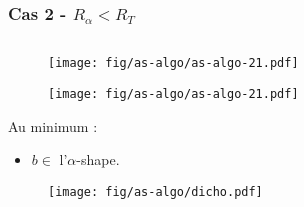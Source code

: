 \documentclass{beamer}
\begin{document}
\begin{frame}
\frametitle{Cas 2 - $R_{\alpha} < R_T$}
  
  \begin{columns}[t]
   \begin{column}{7cm}
      {
        \begin{figure}[h!]
          \centering
          \texttt{[image: fig/as-algo/as-algo-21.pdf]}
      \end{figure}
      }
      {
        \begin{figure}[h!]
          \centering
          \texttt{[image: fig/as-algo/as-algo-21.pdf]}
      \end{figure}
      }
      {
          \begin{block}{}
            \alert{Au minimum} :
            \begin{itemize}
              \item $b \in$ l'$\alpha$-shape.
            \end{itemize} 
          \end{block}
      }         
      {
        \begin{figure}[h!]
          \centering
          \texttt{[image: fig/as-algo/dicho.pdf]}
      \end{figure}
      }
      

\end{column}
\end{columns}
\end{frame}
\end{document}
